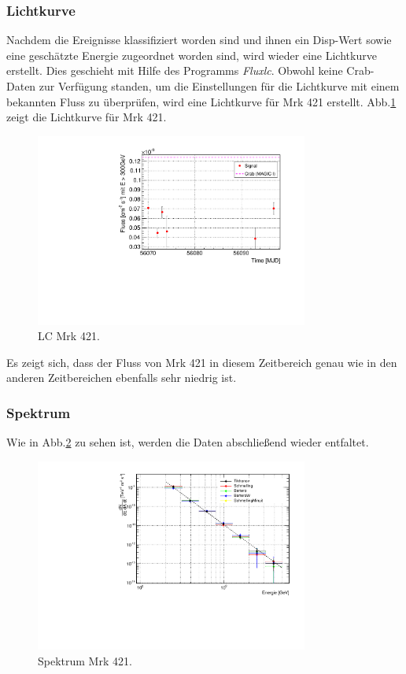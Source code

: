 \subsubsection{Lichtkurve}
Nachdem die Ereignisse klassifiziert worden sind und ihnen ein Disp-Wert sowie eine geschätzte Energie zugeordnet worden sind, wird wieder eine Lichtkurve erstellt.
Dies geschieht mit Hilfe des Programms \textit{Fluxlc}.
Obwohl keine Crab-Daten zur Verfügung standen, um die Einstellungen für die Lichtkurve mit einem bekannten Fluss zu überprüfen, wird eine Lichtkurve für Mrk 421 erstellt.
Abb.\ref{Datenset3_LC_Mrk421} zeigt die Lichtkurve für Mrk 421.

\begin{figure}
    \centering
    \includegraphics[width=0.8\textwidth]{./Plots/04_MrkAnalyse/Datenset3/Datenset3_Mrk421_LC.pdf}
    \caption{LC Mrk 421.}
    \label{Datenset3_LC_Mrk421}
\end{figure}

Es zeigt sich, dass der Fluss von Mrk 421 in diesem Zeitbereich genau wie in den anderen Zeitbereichen ebenfalls sehr niedrig ist.


\subsubsection{Spektrum}

Wie in Abb.\ref{Datenset3_Spektrum_Mrk421} zu sehen ist, werden die Daten abschließend wieder entfaltet.

\begin{figure}
    \centering
    \includegraphics[width=0.8\textwidth]{./Plots/04_MrkAnalyse/Datenset3/Datenset3_Mrk421_Spektrum.pdf}
    \caption{Spektrum Mrk 421.}
    \label{Datenset3_Spektrum_Mrk421}
\end{figure}

